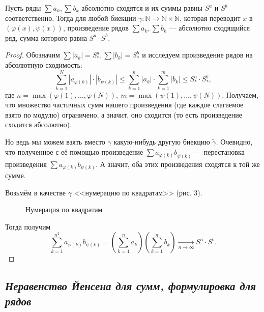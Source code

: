 \begin{theorem}
	Пусть ряды \(\sum a_k, \sum b_k\) абсолютно сходятся и их суммы равны \(S^a\) и \(S^b\) соответственно. Тогда для любой биекции \(\gamma \colon \mathbb{N} \to \mathbb{N} \times \mathbb{N}\), которая переводит \(x\) в \((\varphi(x), \psi(x))\), произведение рядов \(\sum a_k, \sum b_k\) --- абсолютно сходящийся ряд, сумма которого равна \(S^a \cdot S^b\).
\end{theorem}
\begin{proof}
	Обозначим \(\sum |a_k| = S_*^a, \sum |b_k| = S_*^b\) и исследуем произведение рядов на абсолютную сходимость: \[
	\sum_{k=1}^{N} |a_{\varphi(k)}| \cdot |b_{\psi(k)}| \leqslant \sum_{k=1}^{n} |a_k| \cdot \sum_{k=1}^{m} |b_k| \leqslant S_*^a \cdot S_*^b,
	\]
	где \(n = \max(\varphi(1), \ldots, \varphi(N)), \ m = \max(\psi(1), \ldots, \psi(N))\). Получаем, что множество частичных сумм нашего произведения (где каждое слагаемое взято по модулю) ограничено, а значит, оно сходится (то есть произведение сходится абсолютно).
	
	Но ведь мы можем взять вместо \(\gamma\) какую-нибудь другую биекцию \(\widetilde{\gamma}\). Очевидно, что полученное с её помощью произведение \(\sum a_{\widetilde{\varphi}(k)} b_{\widetilde{\psi}(k)}\) --- перестановка произведения \(\sum a_{\varphi(k)} b_{\psi(k)}\). А значит, оба этих произведения сходятся к той же сумме.
	
	Возьмём в качестве \(\gamma\) <<нумерацию по квадратам>> (рис. 3).
	
	\begin{figure}[h!]
		\label{qnum}
		\caption{Нумерация по квадратам}
	\end{figure}
	
	Тогда получим \[
	\sum_{k=1}^{n^2} a_{\varphi(k)} b_{\psi(k)} = \left(\sum_{k=1}^n a_k \right) \left(\sum_{k=1}^n b_k \right) \xrightarrow[n \to \infty]{} S^a \cdot S^b.
	\]
\end{proof}

\subsection{\itshape Неравенство Йенсена для сумм, \color{red} формулировка для рядов}

